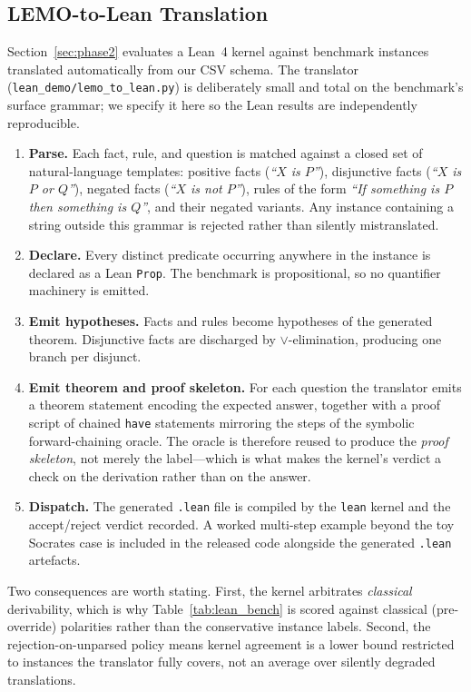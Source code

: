 \documentclass{article}
\begin{document}
\subsection{LEMO-to-Lean Translation}
\label{app:lean-translator}

Section~\ref{sec:phase2} evaluates a Lean~4 kernel against benchmark instances translated automatically from our CSV schema. The translator (\texttt{lean\_demo/lemo\_to\_lean.py}) is deliberately small and total on the benchmark's surface grammar; we specify it here so the Lean results are independently reproducible.

\begin{enumerate}
\item \textbf{Parse.} Each fact, rule, and question is matched against a closed set of natural-language templates: positive facts (\emph{``$X$ is $P$''}), disjunctive facts (\emph{``$X$ is $P$ or $Q$''}), negated facts (\emph{``$X$ is not $P$''}), rules of the form \emph{``If something is $P$ then something is $Q$''}, and their negated variants. Any instance containing a string outside this grammar is rejected rather than silently mistranslated.
\item \textbf{Declare.} Every distinct predicate occurring anywhere in the instance is declared as a Lean \texttt{Prop}. The benchmark is propositional, so no quantifier machinery is emitted.
\item \textbf{Emit hypotheses.} Facts and rules become hypotheses of the generated theorem. Disjunctive facts are discharged by $\lor$-elimination, producing one branch per disjunct.
\item \textbf{Emit theorem and proof skeleton.} For each question the translator emits a theorem statement encoding the expected answer, together with a proof script of chained \texttt{have} statements mirroring the steps of the symbolic forward-chaining oracle. The oracle is therefore reused to produce the \emph{proof skeleton}, not merely the label---which is what makes the kernel's verdict a check on the derivation rather than on the answer.
\item \textbf{Dispatch.} The generated \texttt{.lean} file is compiled by the \texttt{lean} kernel and the accept/reject verdict recorded. A worked multi-step example beyond the toy Socrates case is included in the released code alongside the generated \texttt{.lean} artefacts.
\end{enumerate}

Two consequences are worth stating. First, the kernel arbitrates \emph{classical} derivability, which is why Table~\ref{tab:lean_bench} is scored against classical (pre-override) polarities rather than the conservative instance labels. Second, the rejection-on-unparsed policy means kernel agreement is a lower bound restricted to instances the translator fully covers, not an average over silently degraded translations.
\end{document}
